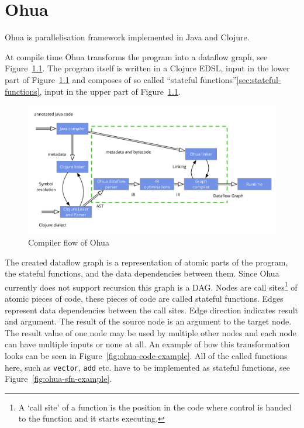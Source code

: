 \chapter{Ohua}

\label{ch:Ohua}

Ohua\cite{Ertel:2015:OID:2807426.2807431}\cite{Ohua:library:link} is parallelisation framework implemented in Java\cite{JavaLanguage} and Clojure\cite{ClojureLanguage}.

At compile time Ohua transforms the program into a dataflow graph, see Figure~\ref{fig:ohua-compiler-flow}.
The program itself is written in a Clojure EDSL, input in the lower part of Figure~\ref{fig:ohua-compiler-flow} and composes of so called ``stateful functions''\ref{sec:stateful-functions}, input in the upper part of Figure~\ref{fig:ohua-compiler-flow}.

\begin{figure}
  \includegraphics[width=\textwidth]{../Figures/ohua-compiler-flow}
  \caption{Compiler flow of Ohua}
  \label{fig:ohua-compiler-flow}
\end{figure}


The created dataflow graph is a representation of atomic parts of the program, the stateful functions, and the data dependencies between them.
Since Ohua currently does not support recursion this graph is a DAG.
Nodes are call sites\footnote{A `call site' of a function is the position in the code where control is handed to the function and it starts executing.} of atomic pieces of code, these pieces of code are called stateful functions.
Edges represent data dependencies between the call sites.
Edge direction indicates result and argument.
The result of the source node is an argument to the target node.
The result value of one node may be used by multiple other nodes and each node can have multiple inputs or none at all.
An example of how this transformation looks can be seen in Figure~\ref{fig:ohua-code-example}.
All of the called functions here, such as \texttt{vector}, \texttt{add} etc. have to be implemented as stateful functions, see Figure~\ref{fig:ohua-sfn-example}.

